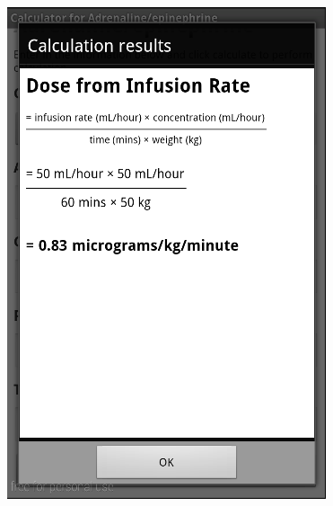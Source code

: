 \begin{figure}[H]
\centering
\begin{minipage}{.5\textwidth}
  \centering
  \includegraphics[width=.8\linewidth]{Images/screenshots/API10/calcResult.png}
\end{minipage}%
\begin{minipage}{.5\textwidth}
  \centering

\end{minipage}
\end{figure}
